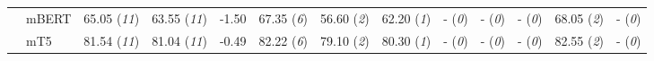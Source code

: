 \begin{tabular}{ll||llr|llllllll}
	 & mBERT & 65.05 (\textit{11}) & 63.55 (\textit{11}) & -1.50 & \cellcolor{high-color!40}  67.35 (\textit{6}) &  56.60 (\textit{2}) & \cellcolor{low-color!40}  62.20 (\textit{1}) & - (\textit{0}) & - (\textit{0}) & - (\textit{0}) &  68.05 (\textit{2}) & - (\textit{0}) \\
	 & mT5 & 81.54 (\textit{11}) & 81.04 (\textit{11}) & -0.49 & \cellcolor{high-color!40}  82.22 (\textit{6}) &  79.10 (\textit{2}) & \cellcolor{low-color!40}  80.30 (\textit{1}) & - (\textit{0}) & - (\textit{0}) & - (\textit{0}) &  82.55 (\textit{2}) & - (\textit{0}) \\
	 \bottomrule
\end{tabular}